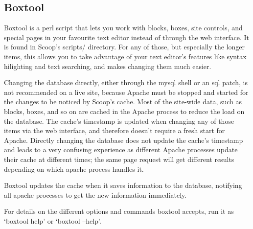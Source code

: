 \subsection{Boxtool}
\label{features-boxtool}

Boxtool is a perl script that lets you work with blocks, boxes, site controls, and special pages in your favourite text editor instead of through the web interface. It is found in Scoop's scripts/ directory. For any of those, but especially the longer items, this allows you to take advantage of your text editor's features like syntax hilighting and text searching, and makes changing them much easier.

Changing the database directly, either through the mysql shell or an sql patch, is not recommended on a live site, because Apache must be stopped and started for the changes to be noticed by Scoop's cache. Most of the site-wide data, such as blocks, boxes, and so on are cached in the Apache process to reduce the load on the database. The cache's timestamp is updated when changing any of those items via the web interface, and therefore doesn't require a fresh start for Apache. Directly changing the database does not update the cache's timestamp and leads to a very confusing experience as different Apache processes update their cache at different times; the same page request will get different results depending on which apache process handles it.

Boxtool updates the cache when it saves information to the database, notifying all apache processes to get the new information immediately.

For details on the different options and commands boxtool accepts, run it as `boxtool help' or `boxtool --help'.


